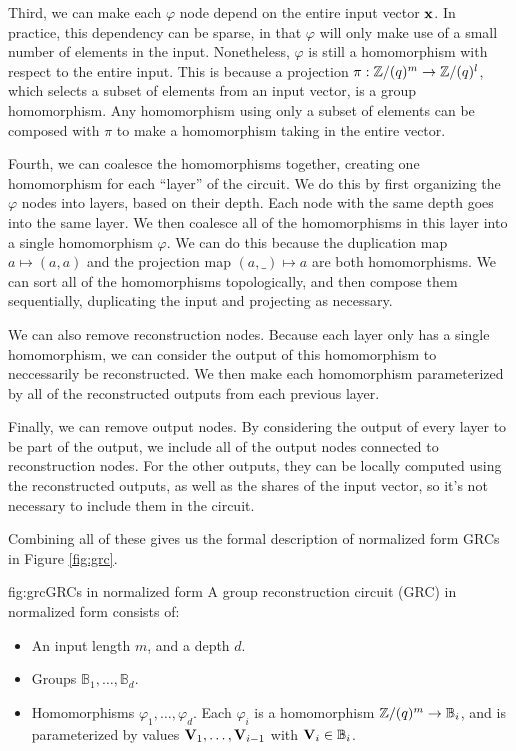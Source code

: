 Third, we can make each $\varphi$ node depend on the entire
input vector $\textbf{x}$.
In practice, this dependency can be sparse, in that $\varphi$
will only make use of a small number of elements in the input.
Nonetheless, $\varphi$ is still a homomorphism with respect
to the entire input.
This is because a projection $\pi : \mathbb{Z}/(q)^m \to \mathbb{Z}/(q)^l$, which selects
a subset of elements from an input vector, is a group homomorphism.
Any homomorphism using only a subset of elements can be composed with $\pi$
to make a homomorphism taking in the entire vector.

Fourth, we can coalesce the homomorphisms together, creating one
homomorphism for each ``layer'' of the circuit.
We do this by first organizing the $\varphi$ nodes into layers,
based on their depth.
Each node with the same depth goes into the same layer.
We then coalesce all of the homomorphisms in this layer into
a single homomorphism $\varphi$.
We can do this because the duplication map $a \mapsto (a, a)$
and the projection map $(a, \_) \mapsto a$ are both homomorphisms.
We can sort all of the homomorphisms topologically, and then compose
them sequentially, duplicating the input and projecting as necessary.

We can also remove reconstruction nodes.
Because each layer only has a single homomorphism, we can consider
the output of this homomorphism to neccessarily be reconstructed.
We then make each homomorphism parameterized by all of the reconstructed
outputs from each previous layer.

Finally, we can remove output nodes.
By considering the output of every layer to be part of the output,
we include all of the output nodes connected to reconstruction nodes.
For the other outputs, they can be locally computed using the reconstructed
outputs, as well as the shares of the input vector, so it's not necessary
to include them in the circuit.

Combining all of these gives us the formal description of normalized form
GRCs in Figure \ref{fig:grc}.

\begin{afigure}{fig:grc}{GRCs in normalized form}
A group reconstruction circuit (GRC) in normalized form consists of:
\begin{itemize}
    \item An input length $m$, and a depth $d$.
    \item Groups $\mathbb{B}_1, \ldots, \mathbb{B}_d$.
    \item Homomorphisms $\varphi_1, \ldots, \varphi_d$. Each $\varphi_i$
    is a homomorphism $\mathbb{Z}/(q)^m \to \mathbb{B}_i$, and is parameterized
    by values $\textbf{V}_1, \ldots, \textbf{V}_{i - 1}$ with $\textbf{V}_i \in \mathbb{B}_i$.
\end{itemize}
\end{afigure}

